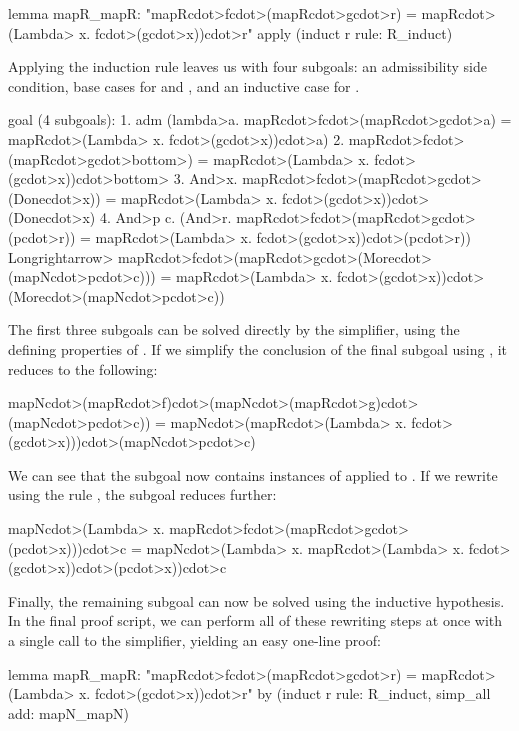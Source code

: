 \begin{isacode}
lemma mapR_mapR: "mapR\<cdot>f\<cdot>(mapR\<cdot>g\<cdot>r) = mapR\<cdot>(\<Lambda> x. f\<cdot>(g\<cdot>x))\<cdot>r"
  apply (induct r rule: R_induct)
\end{isacode}
%
Applying the induction rule leaves us with four subgoals: an admissibility side condition, base cases for  and , and an inductive case for .
%
\begin{isacode}
goal (4 subgoals):
 1. adm (\<lambda>a. mapR\<cdot>f\<cdot>(mapR\<cdot>g\<cdot>a) = mapR\<cdot>(\<Lambda> x. f\<cdot>(g\<cdot>x))\<cdot>a)
 2. mapR\<cdot>f\<cdot>(mapR\<cdot>g\<cdot>\<bottom>) = mapR\<cdot>(\<Lambda> x. f\<cdot>(g\<cdot>x))\<cdot>\<bottom>
 3. \<And>x. mapR\<cdot>f\<cdot>(mapR\<cdot>g\<cdot>(Done\<cdot>x)) = mapR\<cdot>(\<Lambda> x. f\<cdot>(g\<cdot>x))\<cdot>(Done\<cdot>x)
 4. \<And>p c. (\<And>r. mapR\<cdot>f\<cdot>(mapR\<cdot>g\<cdot>(p\<cdot>r)) = mapR\<cdot>(\<Lambda> x. f\<cdot>(g\<cdot>x))\<cdot>(p\<cdot>r)) \<Longrightarrow>
  mapR\<cdot>f\<cdot>(mapR\<cdot>g\<cdot>(More\<cdot>(mapN\<cdot>p\<cdot>c))) = mapR\<cdot>(\<Lambda> x. f\<cdot>(g\<cdot>x))\<cdot>(More\<cdot>(mapN\<cdot>p\<cdot>c))
\end{isacode}
%
The first three subgoals can be solved directly by the simplifier, using the defining properties of . If we simplify the conclusion of the final subgoal using , it reduces to the following:
%
\begin{isacode}
mapN\<cdot>(mapR\<cdot>f)\<cdot>(mapN\<cdot>(mapR\<cdot>g)\<cdot>(mapN\<cdot>p\<cdot>c)) =
  mapN\<cdot>(mapR\<cdot>(\<Lambda> x. f\<cdot>(g\<cdot>x)))\<cdot>(mapN\<cdot>p\<cdot>c)
\end{isacode}
%
We can see that the subgoal now contains instances of  applied to . If we rewrite using the rule , the subgoal reduces further:
%
\begin{isacode}
mapN\<cdot>(\<Lambda> x. mapR\<cdot>f\<cdot>(mapR\<cdot>g\<cdot>(p\<cdot>x)))\<cdot>c =
  mapN\<cdot>(\<Lambda> x. mapR\<cdot>(\<Lambda> x. f\<cdot>(g\<cdot>x))\<cdot>(p\<cdot>x))\<cdot>c
\end{isacode}
%
Finally, the remaining subgoal can now be solved using the inductive hypothesis. In the final proof script, we can perform all of these rewriting steps at once with a single call to the simplifier, yielding an easy one-line proof:
%
\begin{isacode}
lemma mapR_mapR: "mapR\<cdot>f\<cdot>(mapR\<cdot>g\<cdot>r) = mapR\<cdot>(\<Lambda> x. f\<cdot>(g\<cdot>x))\<cdot>r"
  by (induct r rule: R_induct, simp_all add: mapN_mapN)
\end{isacode}

